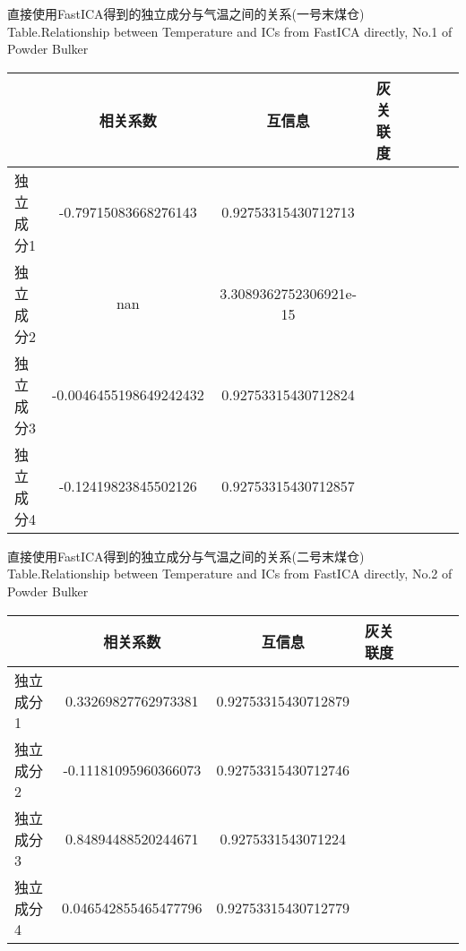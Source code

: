 \begin{table}[!h]
\begin{center}
		{直接使用FastICA得到的独立成分与气温之间的关系(一号末煤仓)}
			{Table.}{Relationship between Temperature and ICs from FastICA directly, No.1 of Powder Bulker}
\begin{tabular}{lccclccc}
\toprule
                & 相关系数     						& 互信息      						&灰关联度 \\
\midrule
  独立成分1     &  -0.79715083668276143     	& 0.92753315430712713			&    \\
  独立成分2     &  nan							& 3.3089362752306921e-15		&    \\
  独立成分3     &  -0.0046455198649242432		& 0.92753315430712824 			&    \\
  独立成分4     &  -0.12419823845502126		& 0.92753315430712857 			&    \\
 \bottomrule
\end{tabular}
\end{center}
\end{table}

\begin{table}[!h]
\begin{center}
		{直接使用FastICA得到的独立成分与气温之间的关系(二号末煤仓)}
			{Table.}{Relationship between Temperature and ICs from FastICA directly, No.2 of Powder Bulker}
\begin{tabular}{lccclccc}
\toprule
                & 相关系数     						& 互信息      						&灰关联度 \\
\midrule
  独立成分1     &  0.33269827762973381	     	& 0.92753315430712879			&    \\
  独立成分2     &  -0.11181095960366073		& 0.92753315430712746			&    \\
  独立成分3     &  0.84894488520244671		& 0.9275331543071224 			&    \\
  独立成分4     &  0.046542855465477796		& 0.92753315430712779			&    \\
 \bottomrule
\end{tabular}
\end{center}
\end{table}

